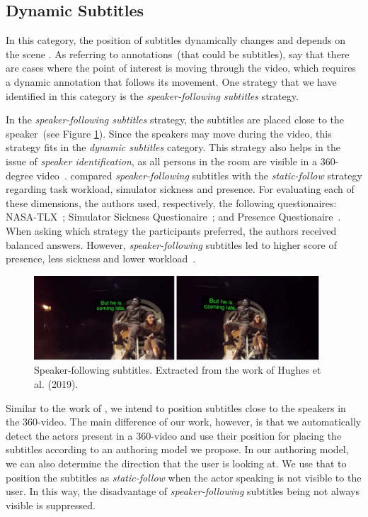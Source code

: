 \subsection{Dynamic Subtitles}
\label{subsection:dynamic_subtitles}

In this category, the position of subtitles dynamically changes and depends on the scene \cite{rothe_dynamic_2018}. As referring to annotations~(that could be subtitles), \cite{matos_dynamic_2018} say that there are cases where the point of interest is moving through the video, which requires a dynamic annotation that follows its movement. One strategy that we have identified in this category is the \emph{speaker-following subtitles} strategy.


In the \emph{speaker-following subtitles} strategy, the subtitles are placed close to the speaker~(see Figure \ref{fig:speaker_following}). Since the speakers may move during the video, this strategy fits in the \emph{dynamic subtitles} category. This strategy also helps in the issue of \emph{speaker identification}, as all persons in the room are visible in a 360-degree video~\cite{rothe_dynamic_2018}.  
\cite{rothe_dynamic_2018} compared \emph{speaker-following} subtitles with the \emph{static-follow} strategy regarding task workload, simulator sickness and presence. For evaluating each of these dimensions, the authors used, respectively, the following questionaires: NASA-TLX~\cite{nasa_hart1988development}; Simulator Sickness Questionaire~\cite{sickness_kennedy1993simulator}; and Presence Questionaire~\cite{presence_witmer1998measuring}. When asking which strategy the participants preferred, the authors received balanced answers. However, \emph{speaker-following} subtitles led to higher score of presence, less sickness and lower workload~\cite{rothe_dynamic_2018}.

\begin{figure}[!ht]
    \centering
    \includegraphics[width=0.95\textwidth]{img/video360/speaker-following.png}
    \caption{Speaker-following subtitles. Extracted from the work of Hughes et al. (2019).}
    \label{fig:speaker_following}
\end{figure}


Similar to the work of \cite{rothe_dynamic_2018}, we intend to position subtitles close to the speakers in the 360-video. The main difference of our work, however, is that we automatically detect the actors present in a 360-video and use their position for placing the subtitles according to an authoring model we propose. In our authoring model, we can also determine the direction that the user is looking at. We use that to position the subtitles as \emph{static-follow} when the actor speaking is not visible to the user. In this way, the disadvantage of \emph{speaker-following} subtitles being not always visible is suppressed.